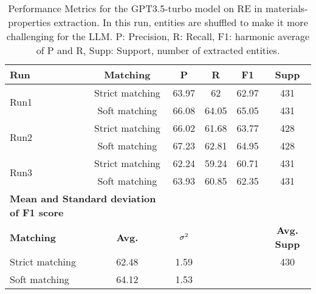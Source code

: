 \begin{table}[htbp]
    \small
    \centering
    \caption{Performance Metrics for the GPT3.5-turbo model on RE in materials-properties extraction. In this run, entities are shuffled to make it more challenging for the LLM. P: Precision, R: Recall, F1: harmonic average of P and R, Supp: Support, number of extracted entities.}
    \begin{tabular}{lccccc}
        \toprule
        \textbf{Run} & \textbf{Matching} & \textbf{P} & \textbf{R} & \textbf{F1} & \textbf{Supp} \\
        \midrule
        \multirow{2}{*}{Run1} & Strict matching & 63.97 & 62 & 62.97 & 431 \\
        & Soft matching & 66.08 & 64.05 & 65.05 & 431 \\
        \midrule
        \multirow{2}{*}{Run2} & Strict matching & 66.02 & 61.68 & 63.77 & 428 \\
        & Soft matching & 67.23 & 62.81 & 64.95 & 428 \\
        \midrule
        \multirow{2}{*}{Run3} & Strict matching & 62.24 & 59.24 & 60.71 & 431 \\
        & Soft matching & 63.93 & 60.85 & 62.35 & 431 \\
        \midrule
        \multicolumn{2}{l}{\textbf{Mean and Standard deviation of F1 score}} & & & & \\
        \midrule
        \textbf{Matching} & \textbf{Avg.} & $\sigma\textsuperscript{2}$ & & & \textbf{Avg. Supp}\\
        Strict matching & 62.48 & 1.59 & & & 430 \\
        Soft matching & 64.12 & 1.53 & & \\
        \bottomrule
    \end{tabular}
\end{table}


